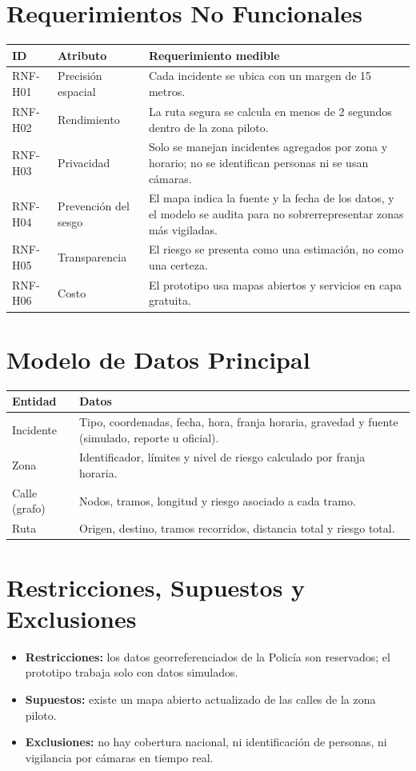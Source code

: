 \documentclass[11pt,a4paper]{article}
\begin{document}
\section{Requerimientos No Funcionales}
{\small
\noindent\begin{tabularx}{\textwidth}{@{}P{1.85cm} P{2.8cm} L@{}}
\toprule
{}
\textbf{ID} & \textbf{Atributo} & \textbf{Requerimiento medible} \\
\midrule
RNF-H01 & Precisión espacial & Cada incidente se ubica con un margen de 15 metros. \\
RNF-H02 & Rendimiento & La ruta segura se calcula en menos de 2 segundos dentro de la zona piloto. \\
RNF-H03 & Privacidad & Solo se manejan incidentes agregados por zona y horario; no se identifican personas ni se usan cámaras. \\
RNF-H04 & Prevención del sesgo & El mapa indica la fuente y la fecha de los datos, y el modelo se audita para no sobrerrepresentar zonas más vigiladas. \\
RNF-H05 & Transparencia & El riesgo se presenta como una estimación, no como una certeza. \\
RNF-H06 & Costo & El prototipo usa mapas abiertos y servicios en capa gratuita. \\
\bottomrule
\end{tabularx}
}

\section{Modelo de Datos Principal}
{\small
\noindent\begin{tabularx}{\textwidth}{@{}P{3.0cm} L@{}}
\toprule
{}
\textbf{Entidad} & \textbf{Datos} \\
\midrule
Incidente & Tipo, coordenadas, fecha, hora, franja horaria, gravedad y fuente (simulado, reporte u oficial). \\
Zona & Identificador, límites y nivel de riesgo calculado por franja horaria. \\
Calle (grafo) & Nodos, tramos, longitud y riesgo asociado a cada tramo. \\
Ruta & Origen, destino, tramos recorridos, distancia total y riesgo total. \\
\bottomrule
\end{tabularx}
}

\section{Restricciones, Supuestos y Exclusiones}
\begin{itemize}[leftmargin=*]
    \item \textbf{Restricciones:} los datos georreferenciados de la Policía son reservados; el prototipo trabaja solo con datos simulados.
    \item \textbf{Supuestos:} existe un mapa abierto actualizado de las calles de la zona piloto.
    \item \textbf{Exclusiones:} no hay cobertura nacional, ni identificación de personas, ni vigilancia por cámaras en tiempo real.
\end{itemize}
\end{document}
